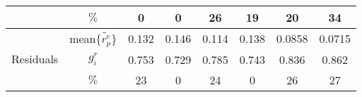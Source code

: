 \begin{tabular}{|cc|c|c|c|c|c|c|}
          & $\%$ &                                        0 &                                        0 &                                       26 &                                       19 &                                       20 &                                       34 \\
\cline{1-8}
\hline \multirow{3}{*}{Residuals} & mean$\{\tilde{r_p^e}\}$ &                                    0.132 &                                    0.146 &                                    0.114 &                                    0.138 &                                   0.0858 &                                   0.0715 \\
          & $g_i^r$ &                                    0.753 &                                    0.729 &                                    0.785 &                                    0.743 &                                    0.836 &                                    0.862 \\
          & $\%$ &                                       23 &                                        0 &                                       24 &                                        0 &                                       26 &                                       27 \\
\hline
\end{tabular}
